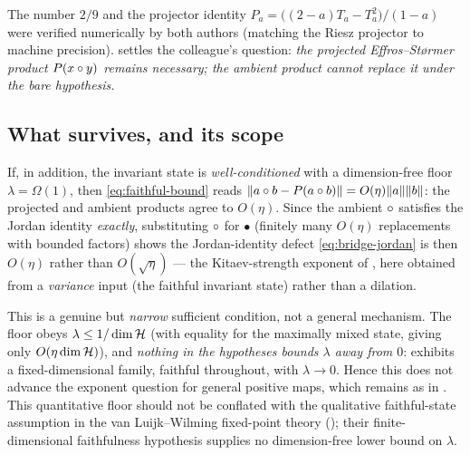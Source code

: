 \noindent
The number $2/9$ and the projector identity $P_a=\big((2-a)T_a-T_a^2\big)/(1-a)$
were verified numerically by both authors (matching the Riesz projector to
machine precision).  settles the colleague's
question: \emph{the projected Effros--St{\o}rmer product $P(x\circ y)$ remains
necessary; the ambient product cannot replace it under the bare hypothesis.}

\subsection*{What survives, and its scope}

\begin{remark}
\label{rem:faithful-scope}
If, in addition, the invariant state is \emph{well-conditioned} with a
dimension-free floor $\lambda=\Omega(1)$, then \eqref{eq:faithful-bound} reads
$\lVert a\circ b-P(a\circ b) \rVert=O(\eta)\lVert a \rVert\lVert b \rVert$: the projected and ambient
products agree to $O(\eta)$. Since the ambient $\circ$ satisfies the Jordan
identity \emph{exactly}, substituting $\circ$ for $\bullet$ (finitely many $O(\eta)$
replacements with bounded factors) shows the Jordan-identity defect
\eqref{eq:bridge-jordan} is then $O(\eta)$ rather than $O(\sqrt\eta)$ --- the
Kitaev-strength exponent of , here obtained from a
\emph{variance} input (the faithful invariant state) rather than a dilation.

This is a genuine but \emph{narrow} sufficient condition, not a general
mechanism. The floor obeys $\lambda\le1/\dim\mathcal{H}$ (with equality for the
maximally mixed state, giving only $O(\eta\dim\mathcal{H})$), and \emph{nothing in the
hypotheses bounds $\lambda$ away from $0$}: 
exhibits a fixed-dimensional family, faithful throughout, with $\lambda\to0$.
Hence this does not advance the exponent question for general positive maps,
which remains as in . This quantitative floor should not be
conflated with the qualitative faithful-state assumption in the
van Luijk--Wilming fixed-point theory (); their finite-dimensional
faithfulness hypothesis supplies no dimension-free lower bound on $\lambda$.
\end{remark}
